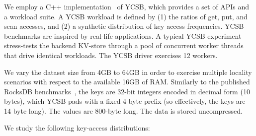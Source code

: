 We employ a C++ implementation~\cite{Cpp-YCSB} of YCSB, which
provides a set of APIs and a workload suite. 
A YCSB workload is defined by  (1) the ratios of get, put, and scan accesses, 
and (2) a synthetic distribution of key access frequencies. 
YCSB  benchmarks  are inspired by real-life applications.
A typical YCSB experiment stress-tests the backend KV-store through a pool of concurrent worker threads that drive identical
workloads. %
The YCSB driver  exercises 12 workers. 

We vary the dataset size from 4GB to 64GB in order to exercise multiple locality 
scenarios with respect to the available 16GB of RAM. Similarly to the published RocksDB benchmarks~\cite{RocksDBPerf}, 
the keys are 32-bit integers encoded in decimal form (10 bytes), which YCSB pads with a fixed 4-byte prefix (so effectively, 
the keys are 14 byte long). The values are 800-byte long. The data is stored uncompressed. 

We study the following key-access distributions:  

